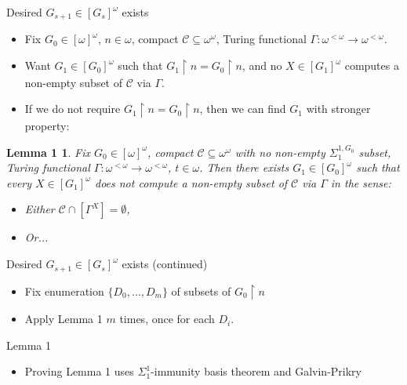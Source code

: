 \begin{frame}{Desired $G_{s+1}\in[G_s]^\omega$ exists}
  \begin{itemize}
    \item Fix $G_0\in[\omega]^\omega$, $n\in\omega$, compact
      $\mathcal{C}\subseteq\omega^\omega$, Turing functional
      $\Gamma:\omega^{<\omega} \rightarrow \omega^{<\omega}$.

    \item Want $G_1\in[G_0]^\omega$ such that $G_1\restriction
      n=G_0\restriction n$, and no $X\in[G_1]^\omega$ computes a non-empty
      subset of $\mathcal{C}$ via $\Gamma$.

    \item If we do not require $G_1\restriction n=G_0\restriction n$, then
      we can find $G_1$ with stronger property:
  \end{itemize}

  \newtheorem{L1}{Lemma 1}
  \begin{L1}
    Fix $G_0\in[\omega]^\omega$, compact
    $\mathcal{C}\subseteq\omega^\omega$ with no non-empty
    $\Sigma_1^{1,G_0}$ subset, Turing functional $\Gamma:\omega^{<\omega}
    \rightarrow \omega^{<\omega}$, $t\in\omega$. Then there exists
    $G_1\in[G_0]^\omega$ such that every $X\in[G_1]^\omega$ does not
    compute a non-empty subset of $\mathcal{C}$ via $\Gamma$ in the
    sense:

    \begin{itemize}
      \item Either $\mathcal{C}\cap[\Gamma^X]=\emptyset$,
      \item Or...
    \end{itemize}
  \end{L1}
\end{frame}

\begin{frame}{Desired $G_{s+1}\in[G_s]^\omega$ exists (continued)}
  \begin{itemize}
      \item Fix enumeration $\{D_0,\ldots,D_m\}$ of subsets of
        $G_0\restriction n$

      \item Apply Lemma 1 $m$ times, once for each $D_i$.
  \end{itemize}
\end{frame}

\begin{frame}{Lemma 1}
  \begin{itemize}
    \item Proving Lemma 1 uses $\Sigma_1^1$-immunity basis theorem and
      Galvin-Prikry
  \end{itemize}
\end{frame}

